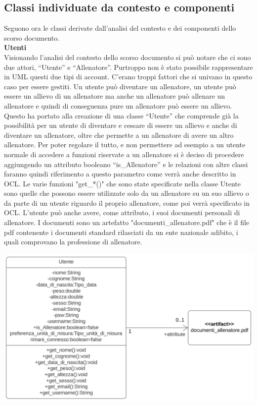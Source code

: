 \documentclass{article}
\begin{document}
      \subsection{Classi individuate da contesto e componenti}
      Seguono ora le classi derivate dall’analisi del contesto e dei componenti dello scorso documento.\\


      {\large\textbf{Utenti}}\\

      Visionando l’analisi del contesto dello scorso documento si può notare che ci sono due attori, “Utente” e “Allenatore”. Purtroppo non è
      stato possibile rappresentare in UML questi due tipi di account. C’erano troppi fattori che si univano in questo caso per essere gestiti. Un
      utente può diventare un allenatore, un utente può essere un allievo di un allenatore ma anche un allenatore può allenare un allenatore e
      quindi di conseguenza pure un allenatore può essere un allievo. Questo ha portato alla creazione di una classe “Utente” che comprende già la
      possibilità per un utente di diventare e cessare di essere un allievo e anche di diventare un allenatore, oltre che permette a un allenatore
      di avere un altro allenatore. Per poter regolare il tutto, e non permettere ad esempio a un utente normale di accedere a funzioni riservate a
      un allenatore si è deciso di procedere aggiungendo un attributo booleano “is\_Allenatore” e le relazioni con altre classi faranno quindi
      riferimento a questo parametro come verrà anche descritto in OCL.
      Le varie funzioni "get\_*()" che sono state specificate nella classe Utente sono quelle che possono essere utilizzate solo da un allenatore su
      un suo allievo o da parte di un utente riguardo il proprio allenatore, come poi verrà specificato in OCL.
      L'utente può anche avere, come attributo, i suoi documenti personali di allenatore. I documenti sono un artefatto "documenti\_allenatore.pdf" che è il file pdf contenente i documenti standard rilasciati da un ente nazionale adibito, i quali comprovano la professione di allenatore.\\
      
      \begin{center}
            \includegraphics[scale=0.5]{classi/Utente.png}
      \end{center}
      
\end{document}
